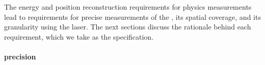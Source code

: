 




The energy and position reconstruction requirements for physics measurements lead to requirements for precise measurements of the \efield, its spatial coverage, and its granularity using the laser. %
 The next sections discuss the rationale behind each requirement, which we take as the  specification.

\paragraph{\efield precision}

